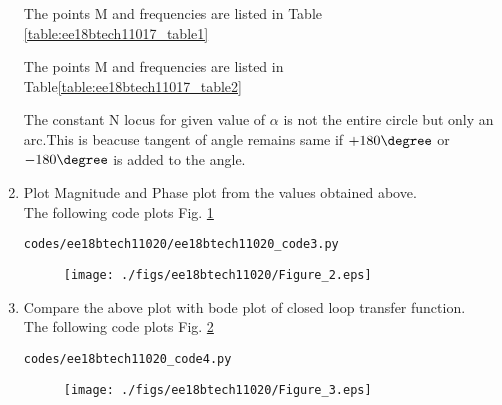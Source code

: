 \begin{enumerate}[label=\thesection.\arabic*.,ref=\thesection.\theenumi]
The points M and frequencies are listed in Table  \ref{table:ee18btech11017_table1}
\begin{table}[!ht]
\centering

\caption{}
\label{table:ee18btech11020_table1}
\end{table}


The points M and frequencies are listed in Table\ref{table:ee18btech11017_table2}
\begin{table}[!ht]
\centering

\caption{}
\label{table:ee18btech11020_table2}
\end{table}

The constant N locus for given value of $\alpha$ is not the entire circle but only an arc.This is beacuse tangent of angle remains same if $+180\degree$ or 
$-180\degree$ is added to the angle.



\item
Plot Magnitude and Phase plot from the values obtained above.\\
\solution
The following code plots Fig. \ref{fig:ee18btech11020_fig2}
\begin{lstlisting}
codes/ee18btech11020/ee18btech11020_code3.py
\end{lstlisting}

\begin{figure}[!h]
  \texttt{[image: ./figs/ee18btech11020/Figure\_2.eps]}
 \caption{}
  \label{fig:ee18btech11020_fig2}
\end{figure}


\item
Compare the above plot with bode plot of closed loop transfer function.\\
\solution
The following code plots Fig. \ref{fig:ee18btech11020_fig3}
\begin{lstlisting}
codes/ee18btech11020_code4.py
\end{lstlisting}

\begin{figure}[!h]
  \texttt{[image: ./figs/ee18btech11020/Figure\_3.eps]}
 \caption{}
  \label{fig:ee18btech11020_fig3}
\end{figure}














\end{enumerate}
